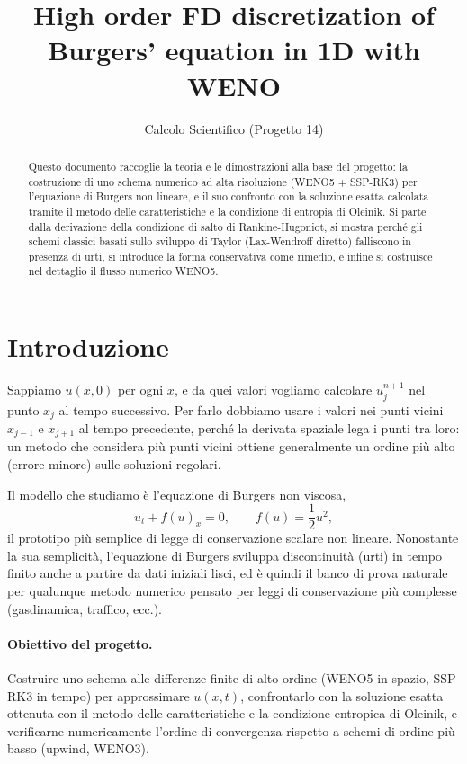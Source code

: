 \documentclass[12pt]{article}
\title{\bfseries High order FD discretization of Burgers' equation in 1D with WENO}
\author{Calcolo Scientifico (Progetto 14)}
\date{}
\begin{document}
\maketitle

\begin{abstract}
\noindent Questo documento raccoglie la teoria e le dimostrazioni alla base del progetto: la costruzione di uno schema numerico ad alta risoluzione (WENO5 + SSP-RK3) per l'equazione di Burgers non lineare, e il suo confronto con la soluzione esatta calcolata tramite il metodo delle caratteristiche e la condizione di entropia di Oleinik. Si parte dalla derivazione della condizione di salto di Rankine-Hugoniot, si mostra perché gli schemi classici basati sullo sviluppo di Taylor (Lax-Wendroff diretto) falliscono in presenza di urti, si introduce la forma conservativa come rimedio, e infine si costruisce nel dettaglio il flusso numerico WENO5.
\end{abstract}

\tableofcontents
\newpage

\section{Introduzione}

Sappiamo $u(x,0)$ per ogni $x$, e da quei valori vogliamo calcolare $u_j^{n+1}$ nel punto $x_j$ al tempo successivo. Per farlo dobbiamo usare i valori nei punti vicini $x_{j-1}$ e $x_{j+1}$ al tempo precedente, perché la derivata spaziale lega i punti tra loro: un metodo che considera più punti vicini ottiene generalmente un ordine più alto (errore minore) sulle soluzioni regolari.

Il modello che studiamo è l'equazione di Burgers non viscosa,
\[
u_t + f(u)_x = 0, \qquad f(u) = \frac{1}{2}u^2,
\]
il prototipo più semplice di legge di conservazione scalare non lineare. Nonostante la sua semplicità, l'equazione di Burgers sviluppa discontinuità (urti) in tempo finito anche a partire da dati iniziali lisci, ed è quindi il banco di prova naturale per qualunque metodo numerico pensato per leggi di conservazione più complesse (gasdinamica, traffico, ecc.).

\paragraph{Obiettivo del progetto.} Costruire uno schema alle differenze finite di alto ordine (WENO5 in spazio, SSP-RK3 in tempo) per approssimare $u(x,t)$, confrontarlo con la soluzione esatta ottenuta con il metodo delle caratteristiche e la condizione entropica di Oleinik, e verificarne numericamente l'ordine di convergenza rispetto a schemi di ordine più basso (upwind, WENO3).
\end{document}
